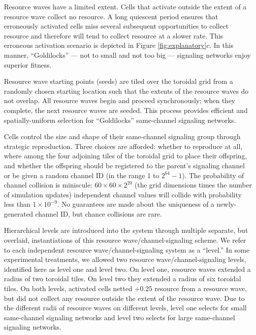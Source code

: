 Resource waves have a limited extent.
Cells that activate outside the extent of a resource wave collect no resource.
A long quiescent period ensures that erroneously activated cells miss several subsequent opportunities to collect resource and therefore will tend to collect resource at a slower rate.
This erroneous activation scenario is depicted in Figure \ref{fig:explanatory}$c$.
In this manner, ``Goldilocks'' --- not to small and not too big --- signaling networks enjoy superior fitness.

Resource wave starting points (seeds) are tiled over the toroidal grid from a randomly chosen starting location such that the extents of the resource waves do not overlap.
All resource waves begin and proceed synchronously;
when they complete, the next resource waves are seeded.
This process provides efficient and spatially-uniform selection for ``Goldilocks'' same-channel signaling networks.

Cells control the size and shape of their same-channel signaling group through strategic reproduction.
Three choices are afforded: whether to reproduce at all, where among the four adjoining tiles of the toroidal grid to place their offspring, and whether the offspring should be registered to the parent's signaling channel or be given a random channel ID (in the range 1 to $2^{64} - 1$).
The probability of channel collision is miniscule: $60 \times 60 \times 2^{20}$ (the grid dimensions times the number of simulation updates) independent channel values will collide with probability less than $1 \times 10^{-9}$.
No guarantees are made about the uniqueness of a newly-generated channel ID, but chance collisions are rare.

Hierarchical levels are introduced into the system through multiple separate, but overlaid, instantiations of this resource wave/channel-signaling scheme.
We refer to each independent resource wave/channel-signaling system as a ``level.''
In some experimental treatments, we allowed two resource wave/channel-signaling levels, identified here as level one and level two.
On level one, resource waves extended a radius of two toroidal tiles.
On level two they extended a radius of six toroidal tiles.
On both levels, activated cells netted $+0.25$ resource from a resource wave, but did not collect any resource outside the extent of the resource wave.
Due to the different radii of resource waves on different levels, level one selects for small same-channel signaling networks and level two selects for large same-channel signaling networks.

